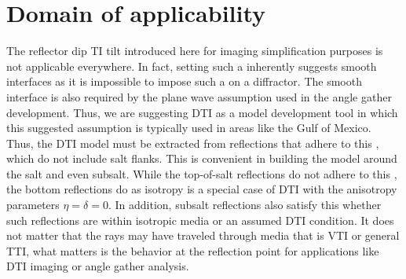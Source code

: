 \section{Domain of applicability}

The reflector dip TI tilt   introduced here for imaging simplification purposes is not applicable everywhere. In fact, setting such a   inherently suggests smooth interfaces as it is impossible to impose such a   on a diffractor. The smooth interface is also required by the plane wave assumption used in the angle gather development. Thus, we are suggesting DTI as a model development tool in which this suggested assumption is typically used in areas like the Gulf of Mexico. Thus, the DTI model must be extracted from reflections that adhere to this  , which do not include salt flanks. This is convenient in building the model around the salt and even subsalt. While the top-of-salt reflections do not adhere to this  , the bottom reflections do as isotropy is a special case of DTI with the anisotropy parameters $\eta=\delta=0$. In addition, subsalt reflections also satisfy this   whether such reflections are within isotropic media or an assumed DTI condition. It does not matter that the rays may have traveled through media that is VTI or general TTI, what matters is the behavior at the reflection point for applications like DTI imaging or angle gather analysis.

